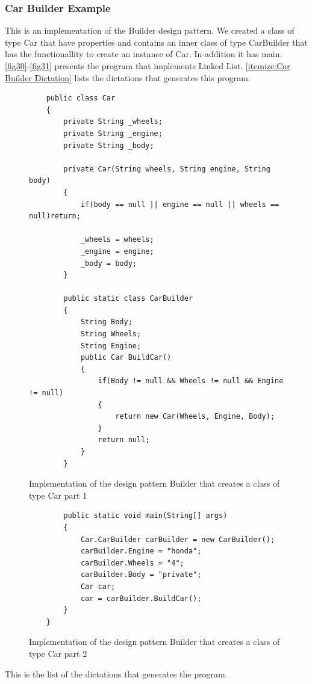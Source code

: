 \subsubsection{Car Builder Example}
This is an implementation of the Builder design pattern. We created a class of type Car that have properties and contains an inner class of type CarBuilder that has the functionallity to create an instance of Car. In-addition it has main. \autoref{fig30}-\autoref{fig31} presents the program that implements Linked List. \autoref{itemize:Car Builder Dictation} lists the dictations that generates this program.
\begin{figure}[H]
	\begin{lstlisting}
	public class Car
	{
		private String _wheels;
		private String _engine;
		private String _body;
	
		private Car(String wheels, String engine, String body)
		{
			if(body == null || engine == null || wheels == null)return;
	
			_wheels = wheels;
			_engine = engine;
			_body = body;
		}
	
		public static class CarBuilder
		{
			String Body;
			String Wheels;
			String Engine;
			public Car BuildCar()
			{
				if(Body != null && Wheels != null && Engine != null)
				{
					return new Car(Wheels, Engine, Body);
				}
				return null;
			}
		}
	\end{lstlisting}
	\caption{Implementation of the design pattern Builder that creates a class of type Car part 1}
	\label{fig30}
\end{figure}
\begin{figure}[H]
	\begin{lstlisting}
		public static void main(String[] args)
		{
			Car.CarBuilder carBuilder = new CarBuilder();
			carBuilder.Engine = "honda";
			carBuilder.Wheels = "4";
			carBuilder.Body = "private";
			Car car;
			car = carBuilder.BuildCar();
		}
	}
	\end{lstlisting}
	\caption{Implementation of the design pattern Builder that creates a class of type Car part 2}
	\label{fig31}
\end{figure}
This is the list of the dictations that generates the program.
